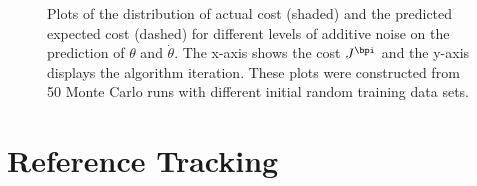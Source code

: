 \begin{figure}[t!]
{\begin{tikzpicture}
\end{tikzpicture}
\label{fig:unicyc1}
} \hfill
{}
\caption{Plots of the distribution of actual cost (shaded) and the predicted expected cost (dashed) for different levels of additive noise on the prediction of $\theta$ and $\dot\theta$. The x-axis shows the cost $J^{\bpi}$ and the y-axis displays the algorithm iteration. These plots were constructed from 50 Monte Carlo runs with different initial random training data sets.}
\label{fig:uniplots}
\end{figure}





\section{Reference Tracking}

